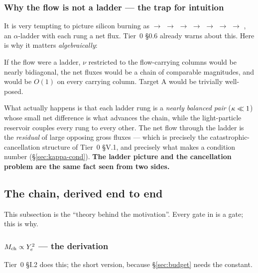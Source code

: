 \subsubsection{Why the flow is not a ladder --- the trap for intuition}
\label{sec:notladder}

It is very tempting to picture silicon burning as  $\to$
 $\to$  $\to$  $\to$  $\to$
 $\to$  $\to$ , an $\alpha$-ladder with each
rung a net flux. Tier~0 \S0.6 already warns about this. Here is why it matters
\emph{algebraically}:

If the flow were a ladder, $\nu$ restricted to the flow-carrying columns would
be nearly bidiagonal, the net fluxes would be a chain of comparable magnitudes,
and \kap{} would be $O(1)$ on every carrying column. Target A would be trivially
well-posed.

What actually happens is that each ladder rung is a \emph{nearly balanced pair}
($\kappa \ll 1$) whose small net difference is what advances the chain, while the
light-particle reservoir couples every rung to every other. The net flow through
the ladder is the \emph{residual} of large opposing gross fluxes --- which is
precisely the catastrophic-cancellation structure of Tier~0 \S V.1, and
precisely what makes \kap{} a condition number (\S\ref{sec:kappa-cond}).
\textbf{The ladder picture and the cancellation problem are the same fact seen
from two sides.}

\subsection{The \texorpdfstring{\Ye}{Ye} chain, derived end to end}
\label{sec:yechain}

This subsection is the ``theory behind the motivation''. Every gate in
 is a \Ye{} gate; this is why.

\subsubsection{\texorpdfstring{$M_{\mathrm{ch}} \propto Y_{e}^2$}{Mch proportional to Ye squared} --- the derivation}
\label{sec:mch}

Tier~0 \S I.2 does this; the short version, because \S\ref{sec:budget} needs the
constant.

